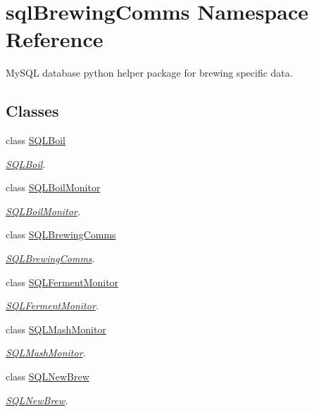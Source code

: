 \hypertarget{namespacesql_brewing_comms}{}\section{sql\+Brewing\+Comms Namespace Reference}
\label{namespacesql_brewing_comms}


My\+S\+QL database python helper package for brewing specific data.  


\subsection*{Classes}
\begin{DoxyCompactItemize}
\item 
class \mbox{\hyperlink{classsql_brewing_comms_1_1_s_q_l_boil}{S\+Q\+L\+Boil}}
\begin{DoxyCompactList}\small\item\em \mbox{\hyperlink{classsql_brewing_comms_1_1_s_q_l_boil}{S\+Q\+L\+Boil}}. \end{DoxyCompactList}\item 
class \mbox{\hyperlink{classsql_brewing_comms_1_1_s_q_l_boil_monitor}{S\+Q\+L\+Boil\+Monitor}}
\begin{DoxyCompactList}\small\item\em \mbox{\hyperlink{classsql_brewing_comms_1_1_s_q_l_boil_monitor}{S\+Q\+L\+Boil\+Monitor}}. \end{DoxyCompactList}\item 
class \mbox{\hyperlink{classsql_brewing_comms_1_1_s_q_l_brewing_comms}{S\+Q\+L\+Brewing\+Comms}}
\begin{DoxyCompactList}\small\item\em \mbox{\hyperlink{classsql_brewing_comms_1_1_s_q_l_brewing_comms}{S\+Q\+L\+Brewing\+Comms}}. \end{DoxyCompactList}\item 
class \mbox{\hyperlink{classsql_brewing_comms_1_1_s_q_l_ferment_monitor}{S\+Q\+L\+Ferment\+Monitor}}
\begin{DoxyCompactList}\small\item\em \mbox{\hyperlink{classsql_brewing_comms_1_1_s_q_l_ferment_monitor}{S\+Q\+L\+Ferment\+Monitor}}. \end{DoxyCompactList}\item 
class \mbox{\hyperlink{classsql_brewing_comms_1_1_s_q_l_mash_monitor}{S\+Q\+L\+Mash\+Monitor}}
\begin{DoxyCompactList}\small\item\em \mbox{\hyperlink{classsql_brewing_comms_1_1_s_q_l_mash_monitor}{S\+Q\+L\+Mash\+Monitor}}. \end{DoxyCompactList}\item 
class \mbox{\hyperlink{classsql_brewing_comms_1_1_s_q_l_new_brew}{S\+Q\+L\+New\+Brew}}
\begin{DoxyCompactList}\small\item\em \mbox{\hyperlink{classsql_brewing_comms_1_1_s_q_l_new_brew}{S\+Q\+L\+New\+Brew}}. \end{DoxyCompactList}\end{DoxyCompactItemize}
